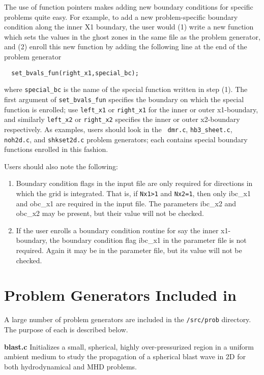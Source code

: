 The use of function pointers makes adding new boundary conditions for specific
problems quite easy.  For example, to add a new problem-specific boundary
condition along the inner X1 boundary, the user would (1) write a new function
which sets the values in the ghost zones in the same
file as the problem generator, and (2) enroll this new function
by adding the following line at the end of the problem generator

\footnotesize
\begin{verbatim}
  set_bvals_fun(right_x1,special_bc);
\end{verbatim}
\normalsize

\noindent
where {\tt special\_bc} is the name of the special function written in
step (1).  The first argument of {\tt set\_bvals\_fun} specifies the
boundary on which the special function is enrolled; use {\tt left\_x1}
or {\tt right\_x1} for the inner or outer x1-boundary, and similarly
{\tt left\_x2} or {\tt right\_x2} specifies the inner or outer
x2-boundary respectively.  As examples, users should look in the {\tt
dmr.c}, {\tt hb3\_sheet.c}, {\tt noh2d.c}, and {\tt shkset2d.c}
problem generators; each contains special boundary functions enrolled
in this fashion.

Users should also note the following:

\begin{enumerate}
\item Boundary condition flags in the input file are only required for 
directions in which the grid is integrated.  That is, if {\tt Nx1>1}
and {\tt Nx2=1}, then only ibc\_x1 and obc\_x1 are required in the
input file.  The parameters ibc\_x2 and obc\_x2 may be present, but
their value will not be checked.
\item If the user enrolls a boundary condition routine for say the inner
x1-boundary, the boundary condition flag ibc\_x1 in the parameter file
is not required.  Again it may be in the parameter file, but its value
will not be checked.
\end{enumerate}

\section{Problem Generators Included in \ath}

A large number of problem generators are included in the {\tt /src/prob}
directory.  The purpose of each is described below.

\bigskip
\noindent
{\bf blast.c}
Initializes a small, spherical, highly over-pressurized region in
a uniform ambient medium to study the propagation of a spherical
blast wave in 2D for both hydrodynamical and MHD problems.



